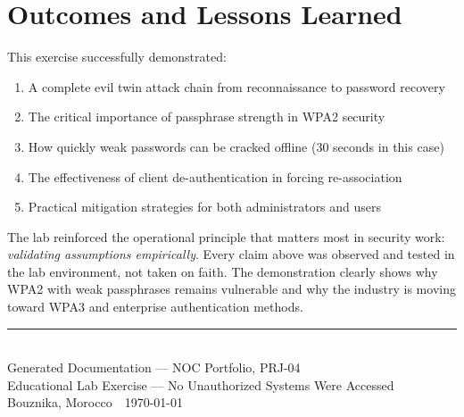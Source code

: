 \documentclass[11pt,a4paper]{article}
\begin{document}
\section{Outcomes and Lessons Learned}
This exercise successfully demonstrated:
\begin{enumerate}
  \item A complete evil twin attack chain from reconnaissance to password recovery
  \item The critical importance of passphrase strength in WPA2 security
  \item How quickly weak passwords can be cracked offline (30 seconds in this case)
  \item The effectiveness of client de-authentication in forcing re-association
  \item Practical mitigation strategies for both administrators and users
\end{enumerate}

The lab reinforced the operational principle that matters most in security work: 
\emph{validating assumptions empirically}. Every claim above was observed and tested 
in the lab environment, not taken on faith. The demonstration clearly shows why WPA2 
with weak passphrases remains vulnerable and why the industry is moving toward WPA3 
and enterprise authentication methods.

\vfill
\begin{center}
  {\small\color{noc}\rule{0.5\textwidth}{0.6pt}}\\[4pt]
  {\footnotesize Generated Documentation --- NOC Portfolio, PRJ-04}\\
  {\footnotesize Educational Lab Exercise --- No Unauthorized Systems Were Accessed}\\
  {\footnotesize Bouznika, Morocco \,\textbullet\, \today}
\end{center}
\end{document}
